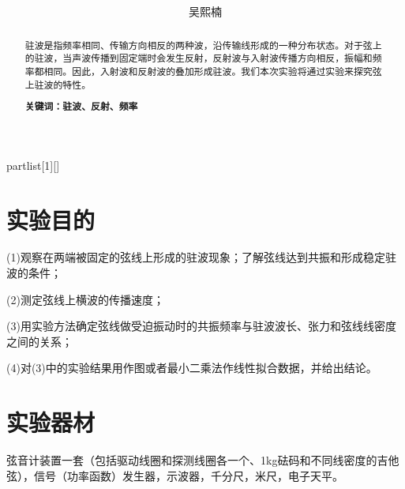 \documentclass[UTF8]{ctexart}
\author{
	吴熙楠}
\title{
	\heiti{弦上驻波实验报告}
}
\begin{document}
	\maketitle
	\newtheorem{definition}{定义}[subsection]
	\newtheorem{function}{公式}[subsection]
	\newtheorem{summary}{小结}[subsection]
	\newtheorem{deduction}{推论}[subsection]
	\newtheorem{property}{性质}[subsection]
	\newtheorem{theo}{定理}[subsection]
	\newtheorem{step}{步骤}[subsection]
	\newtheorem{remark}{注记}[subsection]
	\newtheorem{proof}{证明}[subsection]
	\newenvironment{Theorem}[1][]{\par\noindent\textbf{定理}(#1)\quad}{\par}
	\newcommand{\rbra}[1]{\left( #1 \right)}
	\newcommand{\sbra}[1]{\left[ #1 \right]}
	\newcommand{\cbra}[1]{\left\{ #1 \right\}}
	\newcommand{\pbra}[1]{\left< #1 \right>}
	\newcommand{\abs}[1]{\left| #1 \right|}
	\newcommand{\fs}[2]{\displaystyle\frac{#1}{#2}}
	
	\newenvironment{myproof}{{\color{blue}证：}}
	
	\newenvironment{partlist}[1][]
	{\begin{enumerate}[itemsep=0pt, label=(\arabic*), wide, labelindent=\parindent, listparindent=\parindent, #1]}
		{\end{enumerate}}
	\renewcommand{\abstractname}{\Large 摘要\\}
	\begin{abstract}
		{\normalsize 驻波是指频率相同、传输方向相反的两种波，沿传输线形成的一种分布状态。对于弦上的驻波，当声波传播到固定端时会发生反射，反射波与入射波传播方向相反，振幅和频率都相同。因此，入射波和反射波的叠加形成驻波。我们本次实验将通过实验来探究弦上驻波的特性。
			
			\textbf{关键词：驻波、反射、频率}}
	\end{abstract}
	
	\newpage
	\renewcommand{\contentsname}{目录} %
	\tableofcontents
	\newpage
	\section{实验目的}
	(1)观察在两端被固定的弦线上形成的驻波现象；了解弦线达到共振和形成稳定驻波的条件；
	\par (2)测定弦线上横波的传播速度；
	\par (3)用实验方法确定弦线做受迫振动时的共振频率与驻波波长、张力和弦线线密度之间的关系；
	\par (4)对(3)中的实验结果用作图或者最小二乘法作线性拟合数据，并给出结论。
	\section{实验器材}
	弦音计装置一套（包括驱动线圈和探测线圈各一个、1kg砝码和不同线密度的吉他弦），信号（功率函数）发生器，示波器，千分尺，米尺，电子天平。
\end{document}
